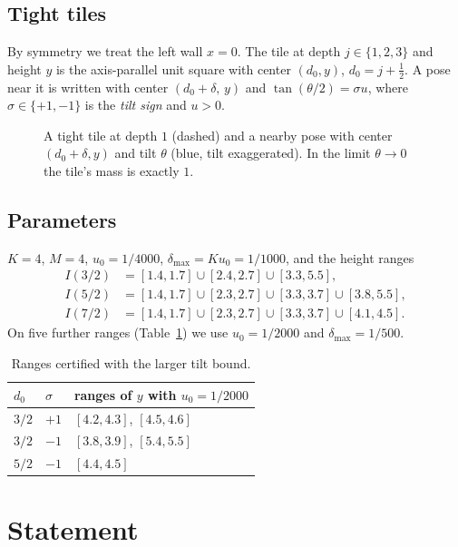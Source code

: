 \documentclass[11pt]{amsart}
\theoremstyle{definition}
\theoremstyle{remark}
\begin{document}
\subsection{Tight tiles}
By symmetry we treat the left wall $x=0$. The tile at depth $j\in\{1,2,3\}$ and height $y$ is the axis-parallel unit
square with center $(d_0,y)$, $d_0=j+\frac12$. A pose near it is written with center $(d_0+\delta,\,y)$ and
$\tan(\theta/2)=\sigma u$, where $\sigma\in\{+1,-1\}$ is the \emph{tilt sign} and $u>0$.

\begin{figure}[ht]
\centering
\caption{A tight tile at depth $1$ (dashed) and a nearby pose with center $(d_0+\delta,y)$ and tilt $\theta$ (blue,
tilt exaggerated). In the limit $\theta\to0$ the tile's mass is exactly $1$.}
\label{fig:tile}
\end{figure}

\subsection{Parameters}
$K=4$, $M=4$, $u_0=1/4000$, $\delta_{\max}=Ku_0=1/1000$, and the height ranges
\begin{align*}
I(3/2)&=[1.4,1.7]\cup[2.4,2.7]\cup[3.3,5.5],\\
I(5/2)&=[1.4,1.7]\cup[2.3,2.7]\cup[3.3,3.7]\cup[3.8,5.5],\\
I(7/2)&=[1.4,1.7]\cup[2.3,2.7]\cup[3.3,3.7]\cup[4.1,4.5].
\end{align*}
On five further ranges (Table~\ref{tab:u2000}) we use $u_0=1/2000$ and $\delta_{\max}=1/500$.

\begin{table}[h]
\begin{tabular}{lll}
\toprule
$d_0$ & $\sigma$ & ranges of $y$ with $u_0=1/2000$\\
\midrule
$3/2$ & $+1$ & $[4.2,4.3]$, $[4.5,4.6]$\\
$3/2$ & $-1$ & $[3.8,3.9]$, $[5.4,5.5]$\\
$5/2$ & $-1$ & $[4.4,4.5]$\\
\bottomrule
\end{tabular}
\caption{Ranges certified with the larger tilt bound.}\label{tab:u2000}
\end{table}

\section{Statement}\label{sec:statement}
\end{document}
